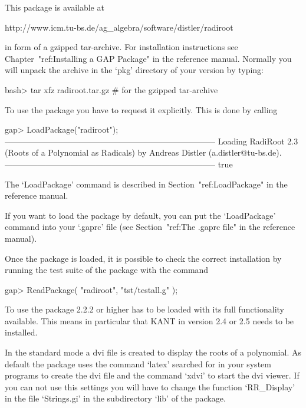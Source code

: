 


This package is available at

\begintt
http://www.icm.tu-bs.de/ag_algebra/software/distler/radiroot
\endtt

in form of a gzipped tar-archive. For installation instructions see
Chapter~"ref:Installing a GAP Package" in the {\GAP} reference manual. 
Normally you will unpack the archive in the `pkg' directory of your
{\GAP} version by typing:

\beginexample
    bash> tar xfz radiroot.tar.gz        # for the gzipped tar-archive
\endexample


To use the {\Radiroot} package you have to request it explicitly. This  is
done by calling

\beginexample
gap> LoadPackage("radiroot");
-----------------------------------------------------------------------------
Loading  RadiRoot 2.3 (Roots of a Polynomial as Radicals)
by Andreas Distler (a.distler@tu-bs.de).
-----------------------------------------------------------------------------
true
\endexample

The `LoadPackage' command is described  in  Section~"ref:LoadPackage"  in
the {\GAP} reference manual.

If you want to load the {\Radiroot} package by default, you  can  put  the
`LoadPackage' command  into  your  `.gaprc'  file  (see  Section~"ref:The
.gaprc file" in the {\GAP} reference manual).

Once the package is loaded, it is possible to check the correct
    installation by running the test suite of the package with the command

\beginexample
    gap> ReadPackage( "radiroot", "tst/testall.g" );
\endexample


To use {\Radiroot} the package {\Alnuth} 2.2.2 or higher has to be
loaded with its full functionality available. This means in particular
that KANT \cite{KANT} in version 2.4 or 2.5 needs to be installed.

In the standard mode a dvi file is created to display the roots of a
polynomial. As default the package uses the command `latex' searched
for in your system programs to create the dvi file and the command
`xdvi' to start the dvi viewer. If you can not use this settings you
will have to change the function `RR_Display' in the file `Strings.gi'
in the subdirectory `lib' of the package.

